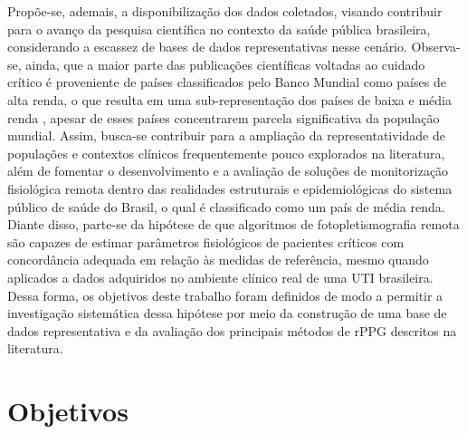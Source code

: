Propõe-se, ademais, a disponibilização dos dados coletados, visando contribuir para o avanço da pesquisa científica no contexto da saúde pública brasileira, considerando a escassez de bases de dados representativas nesse cenário. Observa-se, ainda, que a maior parte das publicações científicas voltadas ao cuidado crítico é proveniente de países classificados pelo Banco Mundial como países de alta renda, o que resulta em uma sub-representação dos países de baixa e média renda \cite{daltro2025global}, apesar de esses países concentrarem parcela significativa da população mundial. Assim, busca-se contribuir para a ampliação da representatividade de populações e contextos clínicos frequentemente pouco explorados na literatura, além de fomentar o desenvolvimento e a avaliação de soluções de monitorização fisiológica remota dentro das realidades estruturais e epidemiológicas do sistema público de saúde do Brasil, o qual é classificado como um país de média renda. Diante disso, parte-se da hipótese de que algoritmos de fotopletismografia remota são capazes de estimar parâmetros fisiológicos de pacientes críticos com concordância adequada em relação às medidas de referência, mesmo quando aplicados a dados adquiridos no ambiente clínico real de uma UTI brasileira. Dessa forma, os objetivos deste trabalho foram definidos de modo a permitir a investigação sistemática dessa hipótese por meio da construção de uma base de dados representativa e da avaliação dos principais métodos de rPPG descritos na literatura.
    
    \section{Objetivos}

